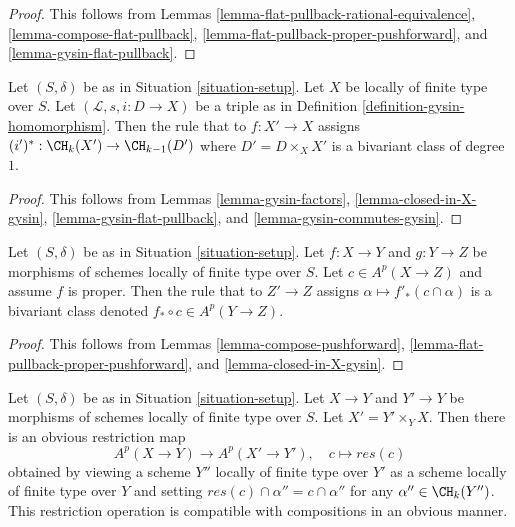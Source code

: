 \begin{proof}
This follows from
Lemmas \ref{lemma-flat-pullback-rational-equivalence},
\ref{lemma-compose-flat-pullback},
\ref{lemma-flat-pullback-proper-pushforward}, and
\ref{lemma-gysin-flat-pullback}.
\end{proof}

\begin{lemma}
\label{lemma-gysin-bivariant}
Let $(S, \delta)$ be as in Situation \ref{situation-setup}.
Let $X$ be locally of finite type over $S$.
Let $(\mathcal{L}, s, i : D \to X)$ be a triple as in
Definition \ref{definition-gysin-homomorphism}.
Then the rule that to $f : X' \to X$ assigns
$(i')^* : \CH_k(X') \to \CH_{k - 1}(D')$ where $D' = D \times_X X'$
is a bivariant class of degree $1$.
\end{lemma}

\begin{proof}
This follows from Lemmas \ref{lemma-gysin-factors},
\ref{lemma-closed-in-X-gysin},
\ref{lemma-gysin-flat-pullback}, and
\ref{lemma-gysin-commutes-gysin}.
\end{proof}

\begin{lemma}
\label{lemma-push-proper-bivariant}
Let $(S, \delta)$ be as in Situation \ref{situation-setup}.
Let $f : X \to Y$ and $g : Y \to Z$ be morphisms of
schemes locally of finite type over $S$.
Let $c \in A^p(X \to Z)$ and assume $f$ is proper.
Then the rule that to $Z' \to Z$ assigns
$\alpha \longmapsto f'_*(c \cap \alpha)$
is a bivariant class denoted $f_* \circ c \in A^p(Y \to Z)$.
\end{lemma}

\begin{proof}
This follows from Lemmas \ref{lemma-compose-pushforward},
\ref{lemma-flat-pullback-proper-pushforward}, and
\ref{lemma-closed-in-X-gysin}.
\end{proof}

\begin{remark}
\label{remark-restriction-bivariant}
Let $(S, \delta)$ be as in Situation \ref{situation-setup}. Let $X \to Y$
and $Y' \to Y$ be morphisms of schemes locally of finite type over $S$.
Let $X' = Y' \times_Y X$. Then there is an obvious restriction map
$$
A^p(X \to Y) \longrightarrow A^p(X' \to Y'),\quad
c \longmapsto res(c)
$$
obtained by viewing a scheme $Y''$ locally of finite type over $Y'$
as a scheme locally of finite type over $Y$ and setting
$res(c) \cap \alpha'' = c \cap \alpha''$ for any $\alpha'' \in \CH_k(Y'')$.
This restriction operation is compatible with compositions in an
obvious manner.
\end{remark}

